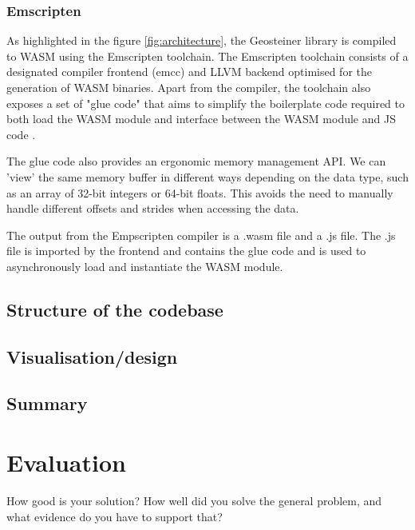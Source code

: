 \documentclass{l4proj}
\begin{document}
\subsection{Emscripten}

As highlighted in the figure \ref{fig:architecture}, the Geosteiner library is compiled to WASM using the Emscripten toolchain. The Emscripten toolchain consists of a designated compiler frontend (emcc) and LLVM backend optimised for the generation of WASM binaries.
Apart from the compiler, the toolchain also exposes a set of "glue code" that aims to simplify the boilerplate code required to both load the WASM module and interface between the WASM module and JS code \citep{Emscripten_tutorial}.

The glue code also provides an ergonomic memory management API. We can 'view' the same memory buffer in different ways depending on the data type, such as an array of 32-bit integers or 64-bit floats. This avoids the need to manually handle different offsets and strides when accessing the data.

The output from the Empscripten compiler is a .wasm file and a .js file. The .js file is imported by the frontend and contains the glue code and is used to asynchronously load and instantiate the WASM module.

\section{Structure of the codebase}

\section{Visualisation/design}

\section{Summary}


\chapter{Evaluation}
How good is your solution? How well did you solve the general problem, and what evidence do you have to support that?
\end{document}
